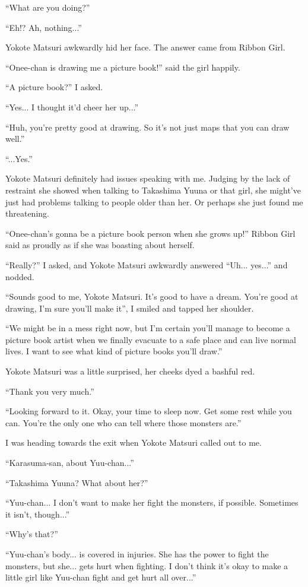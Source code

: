 ``What are you doing?''

``Eh!? Ah, nothing...''

Yokote Matsuri awkwardly hid her face. The answer came from Ribbon Girl.

``Onee-chan is drawing me a picture book!'' said the girl happily.

``A picture book?'' I asked.

``Yes... I thought it'd cheer her up...''

``Huh, you're pretty good at drawing. So it's not just maps that you can draw well.''

``...Yes.''

Yokote Matsuri definitely had issues speaking with me. Judging by the lack of restraint she showed when talking to Takashima Yuuna or that girl, she might've just had problems talking to people older than her. Or perhaps she just found me threatening.

``Onee-chan's gonna be a picture book person when she grows up!'' Ribbon Girl said as proudly as if she was boasting about herself.

``Really?'' I asked, and Yokote Matsuri awkwardly answered ``Uh... yes...'' and nodded.

``Sounds good to me, Yokote Matsuri. It's good to have a dream. You're good at drawing, I'm sure you'll make it'', I smiled and tapped her shoulder.

``We might be in a mess right now, but I'm certain you'll manage to become a picture book artist when we finally evacuate to a safe place and can live normal lives. I want to see what kind of picture books you'll draw.''

Yokote Matsuri was a little surprised, her cheeks dyed a bashful red.

``Thank you very much.''

``Looking forward to it. Okay, your time to sleep now. Get some rest while you can. You're the only one who can tell where those monsters are.''

I was heading towards the exit when Yokote Matsuri called out to me.

``Karasuma-san, about Yuu-chan...''

``Takashima Yuuna? What about her?''

``Yuu-chan... I don't want to make her fight the monsters, if possible. Sometimes it isn't, though...''

``Why's that?''

``Yuu-chan's body... is covered in injuries. She has the power to fight the monsters, but she... gets hurt when fighting. I don't think it's okay to make a little girl like Yuu-chan fight and get hurt all over...''

